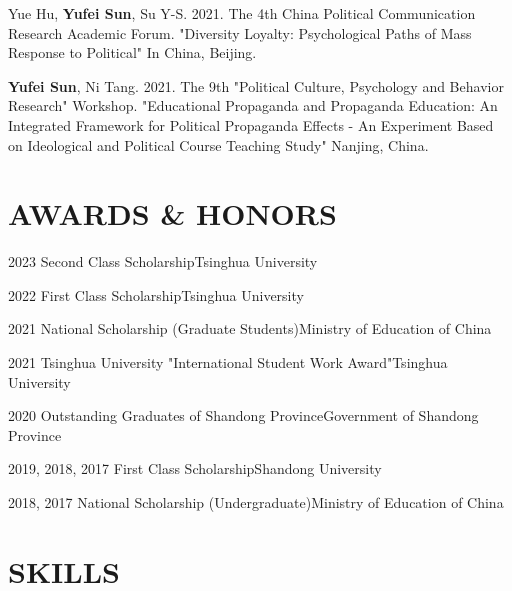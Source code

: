 \documentclass[11pt,a4paper]{article}
\begin{document}
\begin{spacing}{1}
Yue Hu, \textbf{Yufei Sun}, Su Y-S. 2021. The 4th China Political Communication Research Academic Forum. "Diversity Loyalty: Psychological Paths of Mass Response to Political" In China, Beijing.
\end{spacing}

\begin{spacing}{1}
\textbf{Yufei Sun}, Ni Tang. 2021. The 9th "Political Culture, Psychology and Behavior Research" Workshop. "Educational Propaganda and Propaganda Education: An Integrated Framework for Political Propaganda Effects - An Experiment Based on Ideological and Political Course Teaching Study" Nanjing, China.
\end{spacing}

\section*{AWARDS \& HONORS}
\begin{spacing}{1}
2023 Second Class Scholarship\hfill Tsinghua University
\end{spacing}

\begin{spacing}{1}
2022 First Class Scholarship\hfill Tsinghua University
\end{spacing}

\begin{spacing}{1}
2021 National Scholarship (Graduate Students)\hfill Ministry of Education of China
\end{spacing}

\begin{spacing}{1}
2021 Tsinghua University "International Student Work Award"\hfill Tsinghua University
\end{spacing}

\begin{spacing}{1}
2020 Outstanding Graduates of Shandong Province\hfill Government of Shandong Province
\end{spacing}

\begin{spacing}{1}
2019, 2018, 2017 First Class Scholarship\hfill Shandong University
\end{spacing}

\begin{spacing}{1}
2018, 2017 National Scholarship (Undergraduate)\hfill Ministry of Education of China
\end{spacing}

\section*{SKILLS}
\end{document}
